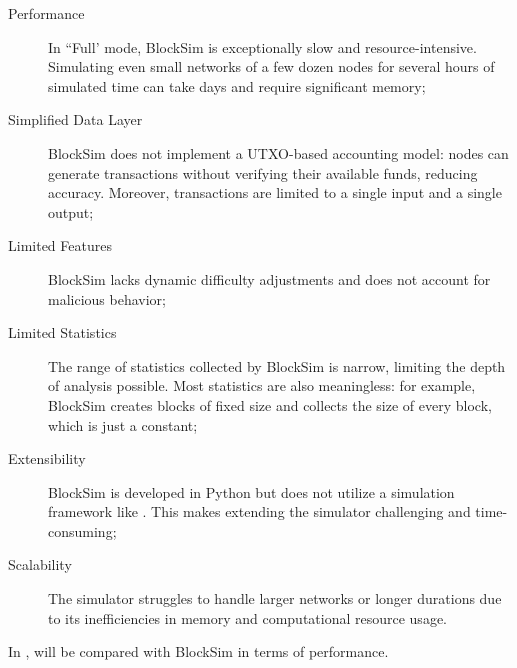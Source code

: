 \begin{description}
	\item[Performance] In ``Full' mode, BlockSim is exceptionally slow and
		resource-intensive. Simulating even small networks of a few
		dozen nodes for several hours of simulated time can take days
		and require significant memory;
	\item[Simplified Data Layer] BlockSim does not implement a UTXO-based
		accounting model: nodes can generate transactions without
		verifying their available funds, reducing accuracy. Moreover,
		transactions are limited to a single input and a single output;
	\item[Limited Features] BlockSim lacks dynamic difficulty adjustments
		and does not account for malicious behavior;
	\item[Limited Statistics] The range of statistics collected by BlockSim
		is narrow, limiting the depth of analysis possible. Most
		statistics are also meaningless: for example, BlockSim creates
		blocks of fixed size and collects the size of every block,
		which is just a constant;
	\item[Extensibility] BlockSim is developed in Python but does not
		utilize a simulation framework like \omnetpp{}. This makes
		extending the simulator challenging and time-consuming;
	\item[Scalability] The simulator struggles to handle larger networks or
		longer durations due to its inefficiencies in memory and
		computational resource usage.
\end{description}

In , \iblock{} will be compared with BlockSim in terms
of performance.
